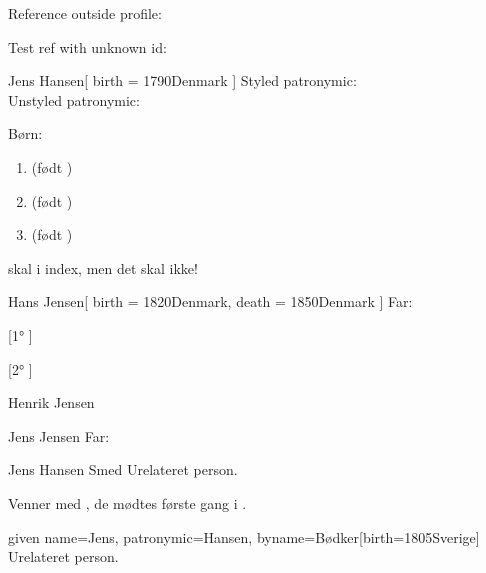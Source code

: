 \documentclass[
	twocolumn
]{article}
\begin{document}
Reference outside profile: 

Test ref with unknown id: 


\begin{gprProfile}{Jens Hansen}[
	birth = {1790}{Denmark}
]
	Styled patronymic: \gprPatronymic{}\\
	Unstyled patronymic: \gprPatronymic*{}

	Børn:
	\begin{enumerate}
	\item {} (født )
	\item {} (født )
	\item {} (født )
	\end{enumerate}

	 skal i index, men det skal  ikke!
\end{gprProfile}

\begin{gprProfile}{Hans Jensen}[
	birth = {1820}{Denmark},
	death = {1850}{Denmark}
]
	Far:

	[1° ]

	[2° ]
\end{gprProfile}

\begin{gprProfile}{Henrik Jensen}
	
	\lipsum[1-5]

\end{gprProfile}

\begin{gprProfile}[id=ABC]{Jens Jensen}
	Far:

\end{gprProfile}

\begin{gprProfile}{Jens Hansen Smed}
	Urelateret person.
	
	Venner med , de mødtes første gang i .

\end{gprProfile}

\begin{gprProfile*}{given name=Jens, patronymic=Hansen, byname=Bødker}[birth={1805}{Sverige}]
	Urelateret person.

\end{gprProfile*}
\end{document}
